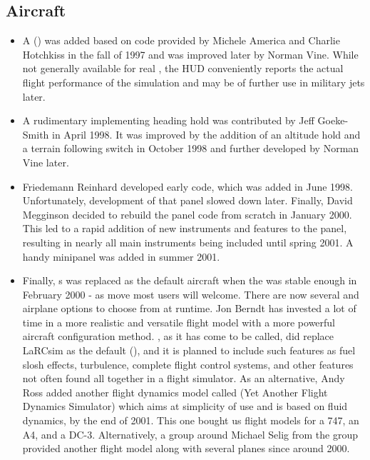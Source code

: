 \subsection{Aircraft}
\begin{itemize}
\item A  () was added based on code
 provided by Michele America and Charlie Hotch\-kiss in the fall of 1997 and was improved later by Norman Vine. While not generally available for real , the HUD conveniently reports the actual flight performance of the simulation and may be of further use in military jets later.
 \item A rudimentary  implementing heading hold was
contributed by Jeff Goeke-Smith in April 1998. It was improved
by the addition of an altitude hold and a terrain following switch in October 1998 and
further developed by Norman Vine later.
\item Friedemann Reinhard  developed early  code, which was added in June 1998. Unfortunately, development of that panel slowed down later. Finally, David Megginson  decided to rebuild the panel code from scratch in January 2000. This led to a rapid addition of new instruments and features to the panel, resulting in nearly all main instruments being included until spring 2001. A handy minipanel was added in summer 2001.
\item Finally, s  was replaced as the default aircraft
 when the  was stable enough in February 2000 - as move most users will welcome. There are now several  and airplane options to choose from at runtime. Jon Berndt has invested a lot of time in a more
realistic and versatile flight model with a more powerful aircraft configuration method.
\JSBSim, as it has come to be called, did replace LaRCsim as the default
 (), and it is planned to include such features as fuel slosh effects, turbulence, complete flight control systems, and other features not often found
all together in a flight simulator. As an alternative, Andy Ross added another flight dynamics model called \YASim{} (Yet Another Flight Dynamics Simulator) which aims at simplicity of use and is based on fluid dynamics, by the end of 2001. This one bought us flight models for a 747, an A4, and a DC-3. Alternatively, a group around Michael Selig from the  group provided another flight model along with several planes since around 2000.

\end{itemize}
